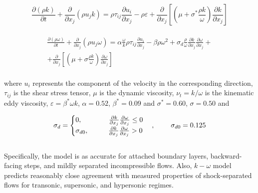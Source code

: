 \documentclass[a5paper]{sapthesis}
\begin{document}
	\begin{equation}
		\frac{\partial (\rho k)}{\partial t} + \frac{\partial}{\partial x_j} (\rho u_j k) =
		\rho \tau_{ij} \frac{\partial u_i}{\partial x_j} - \rho \varepsilon + \frac{\partial}{\partial x_j} \left[ \left( \mu + \sigma^* \frac{\rho k}{\omega} \right) \frac{\partial k}{\partial x_j} \right]
		\label{tke_equation}
	\end{equation}
	\\	
	\begin{equation}
		\begin{aligned}
			\frac{\partial (\rho \omega)}{\partial t} + \frac{\partial}{\partial x_j} (\rho u_j \omega) =
			\alpha \frac{\omega}{k} \rho \tau_{ij} \frac{\partial u_i}{\partial x_j} - 	\beta \rho \omega^2 
			+ \sigma_d \frac{\rho}{\omega} \frac{\partial k}{\partial x_j} 	\frac{\partial \omega}{\partial x_j} +
			\\
			+ \frac{\partial}{\partial x_j} \left[ \left( \mu + \sigma \frac{\rho 	k}{\omega} \right) \frac{\partial \omega}{\partial x_j} \right]
		\end{aligned}
		\label{specific_dissipation_rate_equation}
	\end{equation}
	\\
	where $u_i$ represents the component of the velocity in the corresponding direction, $\tau_{ij}$ is the shear stress tensor, $\mu$ is the dynamic viscosity, $\nu_t = k/\omega$ is the kinematic eddy viscosity, $\varepsilon =\beta^* \omega k$, $\alpha = 0.52$, $\beta^* = 0.09$ and $\sigma^*=0.60$, $\sigma = 0.50$ and 
	
	\begin{equation}
		\sigma_d =
		\begin{cases}
			0, \hspace{13.5mm} \frac{\partial k}{\partial x_j} 	\frac{\partial \omega}{\partial x_j} \leq 0 \\
			\sigma_{d0}, \hspace{10mm} \frac{\partial k}{\partial x_j} 	\frac{\partial \omega}{\partial x_j} > 0
		\end{cases},
		\hspace{8mm}\sigma_{d0} =0.125
	\end{equation}	
	\\
	Speciﬁcally, the model is as accurate for attached boundary layers, backward-facing steps, and mildly separated incompressible ﬂows. Also, $k-\omega$ model predicts  reasonably close agreement with measured properties of shock-separated ﬂows for transonic, supersonic, and hypersonic regimes.
	
\end{document}
